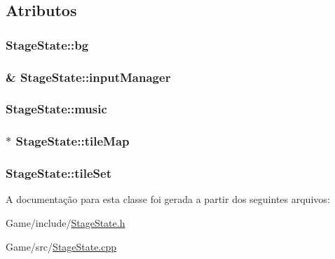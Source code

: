 \subsection{Atributos}
\hypertarget{classStageState_aa52c55dee219d1bbd1690e8c3c8e34f6}{
\subsubsection[{bg}]{ Stage\+State\+::bg\hspace{0.3cm}{\ttfamily [private]}}}\label{classStageState_aa52c55dee219d1bbd1690e8c3c8e34f6}
\hypertarget{classStageState_acbf7ba483ee1ae6fe7d20f22b5c721b3}{
\subsubsection[{input\+Manager}]{\& Stage\+State\+::input\+Manager\hspace{0.3cm}{\ttfamily [private]}}}\label{classStageState_acbf7ba483ee1ae6fe7d20f22b5c721b3}
\hypertarget{classStageState_a60c8325a1df466aff9f24ea167178350}{
\subsubsection[{music}]{ Stage\+State\+::music\hspace{0.3cm}{\ttfamily [private]}}}\label{classStageState_a60c8325a1df466aff9f24ea167178350}
\hypertarget{classStageState_a1c795e4b3e5c0522709a6060e52291e4}{
\subsubsection[{tile\+Map}]{$\ast$ Stage\+State\+::tile\+Map\hspace{0.3cm}{\ttfamily [private]}}}\label{classStageState_a1c795e4b3e5c0522709a6060e52291e4}
\hypertarget{classStageState_ac1ef17645d0585767eaf96693a88d9bb}{
\subsubsection[{tile\+Set}]{ Stage\+State\+::tile\+Set\hspace{0.3cm}{\ttfamily [private]}}}\label{classStageState_ac1ef17645d0585767eaf96693a88d9bb}


A documentação para esta classe foi gerada a partir dos seguintes arquivos\+:\begin{DoxyCompactItemize}
\item 
Game/include/\hyperlink{StageState_8h}{Stage\+State.\+h}\item 
Game/src/\hyperlink{StageState_8cpp}{Stage\+State.\+cpp}\end{DoxyCompactItemize}
